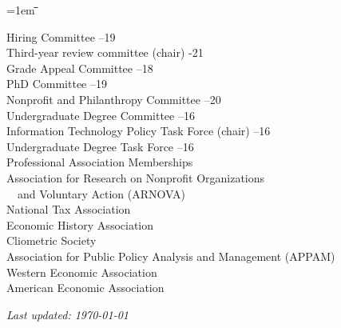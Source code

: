 \documentclass[12pt]{article}
\newlength{\midlength}
\newlength{\firstlength}
\newlength{\listindent}
\newlength{\dategap}
\newlength{\wrapgap}
\newenvironment{datetabbing}{
	\begin{tabbing}
	\parskip=1em
	\hspace*{\listindent}\=\hspace*{\firstlength}\=\hspace*{\midlength}\= \kill
}{
	\end{tabbing}
}
\begin{document}
\begin{datetabbing}
\>	\>	Hiring Committee										--19	\'	\\[\wrapgap]
\>	\>	Third-year review committee (chair)					-21		\'	\\[\wrapgap]
\>	\>	Grade Appeal Committee								--18	\'	\\[\wrapgap]
\>	\>	PhD Committee										--19	\'	\\[\wrapgap]
\>	\>	Nonprofit and Philanthropy Committee					--20	\'	\\[\wrapgap]
\>	\>	Undergraduate Degree Committee						--16	\'	\\[\wrapgap]
\>	\>	Information Technology Policy Task Force (chair)		--16	\'	\\[\wrapgap]
\>	\>	Undergraduate Degree Task Force						--16	\'	\\[\dategap]
\>	Professional Association Memberships												\\[\wrapgap]
\>	\>	Association for Research on Nonprofit Organizations						\>	\\[\wrapgap]
\>	\>	~~and Voluntary Action (ARNOVA)											\>	\\[\wrapgap]
\>	\>	National Tax Association													\>	\\[\wrapgap]
\>	\>	Economic History Association												\>	\\[\wrapgap]
\>	\>	Cliometric Society														\>	\\[\wrapgap]
\>	\>	Association for Public Policy Analysis and Management (APPAM)			\>	\\[\wrapgap]
\>	\>	Western Economic Association												\>	\\[\wrapgap]
\>	\>	American Economic Association											%
\end{datetabbing}

	
\vfill{}
\begin{scriptsize}
\textit{Last updated: \today{} }
\end{scriptsize}
\end{document}
